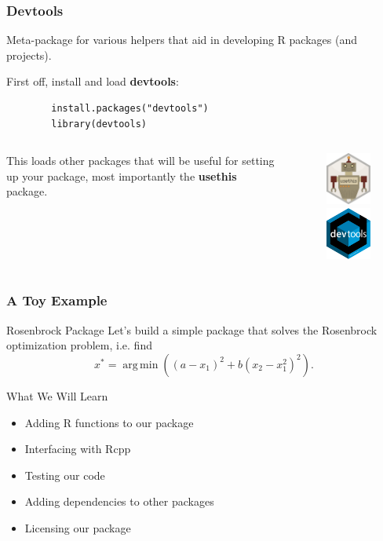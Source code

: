 \documentclass[aspectratio=1610,onlytextwidth]{beamer}
\begin{document}
\begin{frame}[c,fragile]
  \frametitle{Devtools}

  Meta-package for various helpers that
  aid in developing R packages (and projects).

  First off, install and load \textbf{devtools}:
  \begin{lstlisting}
        install.packages("devtools")
        library(devtools)
      \end{lstlisting}

  \begin{columns}
    \begin{column}{0.45\textwidth}

      This loads other packages that will be useful
      for setting up your package, most importantly the \textbf{usethis}
      package.
    \end{column}
    \begin{column}{0.45\textwidth}
      \begin{figure}[htpb]
        \centering
        \includegraphics[width=2.5cm]{images/usethis-logo.png}%
        \includegraphics[width=2.5cm]{images/devtools.pdf}
      \end{figure}
    \end{column}
  \end{columns}
\end{frame}

\begin{frame}[c]
  \frametitle{A Toy Example}

  \begin{block}{Rosenbrock Package}
    Let's build a simple package that solves the Rosenbrock optimization problem, i.e.
    find
    \[
      x^* = \operatorname{arg\,min}\left((a - x_1)^2 + b(x_2 - x_1^2)^2\right).
    \]
  \end{block}

  \bigskip\pause

  \begin{block}{What We Will Learn}
    \begin{itemize}[<+->]
      \item Adding R functions to our package
      \item Interfacing with Rcpp
      \item Testing our code
      \item Adding dependencies to other packages
      \item Licensing our package
    \end{itemize}
  \end{block}
\end{frame}
\end{document}
